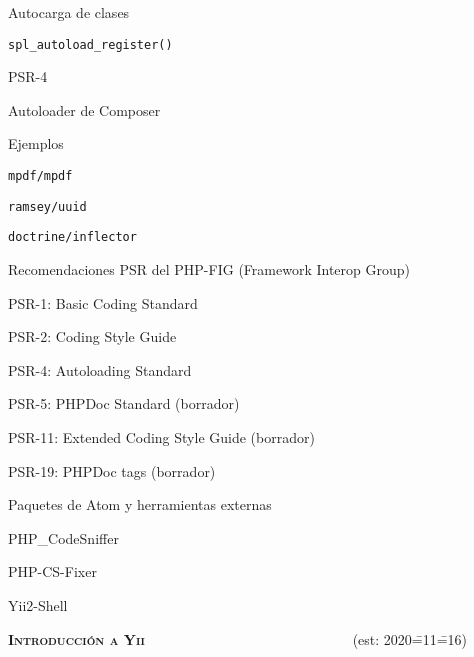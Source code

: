 \begin{longenum}
\begin{longenum}
\begin{longenum}
        \end{longenum}
        \item Autocarga de clases
        \begin{longenum}
            \item \texttt{spl\_autoload\_register()}
            \item PSR-4
            \item Autoloader de Composer
        \end{longenum}
        \item Ejemplos
        \begin{longenum}
            \item \texttt{mpdf/mpdf}
            \item \texttt{ramsey/uuid}
            \item \texttt{doctrine/inflector}
        \end{longenum}
        \item Recomendaciones PSR del PHP-FIG (Framework Interop Group)
        \begin{longenum}
            \item PSR-1: Basic Coding Standard
            \item PSR-2: Coding Style Guide
            \item PSR-4: Autoloading Standard
            \item PSR-5: PHPDoc Standard (borrador)
            \item PSR-11: Extended Coding Style Guide (borrador)
            \item PSR-19: PHPDoc tags (borrador)
        \end{longenum}
        \item Paquetes de Atom y herramientas externas \opcional\
        \begin{longenum}
            \item PHP\_CodeSniffer
            \item PHP-CS-Fixer
            \item Yii2-Shell
        \end{longenum}
    \end{longenum}
    \item \textbf{\textsc{Introducción a Yii}} \ \ \ \ \ \ \ \ \ \ \ \ \ \ \ \ \ \ \ \ \ \ \ \ \ \ \ \ \ (est: 2020\==11\==16)
    \begin{longenum}

\end{longenum}
\end{longenum}
